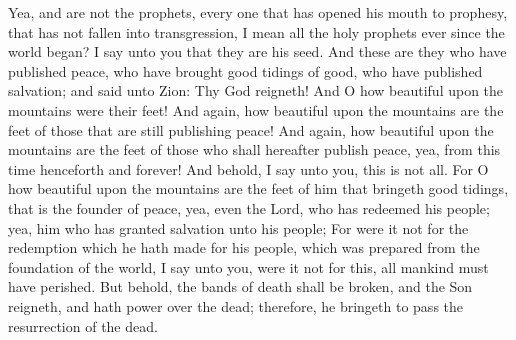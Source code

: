 Yea, and are not the prophets, every one that has opened his mouth to prophesy, that has not fallen into transgression, I mean all the holy prophets ever since the world began? I say unto you that they are his seed.
\bverse \iffalse And these are they who have published peace, who have brought good tidings of good, who have published salvation; and said unto Zion: Thy God reigneth! \fi
And these are they who have published peace, who have brought good tidings of good, who have published salvation; and said unto Zion: Thy God reigneth!
\bverse \iffalse And O how beautiful upon the mountains were their feet! \fi
And O how beautiful upon the mountains were their feet!
\bverse \iffalse And again, how beautiful upon the mountains are the feet of those that are still publishing peace! \fi
And again, how beautiful upon the mountains are the feet of those that are still publishing peace!
\bverse \iffalse And again, how beautiful upon the mountains are the feet of those who shall hereafter publish peace, yea, from this time henceforth and forever! \fi
And again, how beautiful upon the mountains are the feet of those who shall hereafter publish peace, yea, from this time henceforth and forever!
\bverse \iffalse And behold, I say unto you, this is not all. For O how beautiful upon the mountains are the feet of him that bringeth good tidings, that is the founder of peace, yea, even the Lord, who has redeemed his people; yea, him who has granted salvation unto his people; \fi
And behold, I say unto you, this is not all. For O how beautiful upon the mountains are the feet of him that bringeth good tidings, that is the founder of peace, yea, even the Lord, who has redeemed his people; yea, him who has granted salvation unto his people;
\bverse \iffalse For were it not for the redemption which he hath made for his people, which was prepared from the foundation of the world, I say unto you, were it not for this, all mankind must have perished. \fi
For were it not for the redemption which he hath made for his people, which was prepared from the foundation of the world, I say unto you, were it not for this, all mankind must have perished.
\bverse \iffalse But behold, the bands of death shall be broken, and the Son reigneth, and hath power over the dead; therefore, he bringeth to pass the resurrection of the dead. \fi
But behold, the bands of death shall be broken, and the Son reigneth, and hath power over the dead; therefore, he bringeth to pass the resurrection of the dead.
